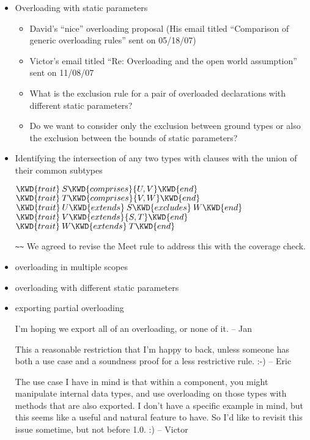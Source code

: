 \begin{itemize}
\item Overloading with static parameters
\begin{itemize}
\item David's ``nice'' overloading proposal (His email titled ``Comparison of generic overloading rules'' sent on 05/18/07)
\item Victor's email titled ``Re: Overloading and the open world assumption''
sent on 11/08/07
\item What is the exclusion rule for a pair of overloaded declarations with different static parameters?
\item Do we want to consider only the exclusion between ground types or also the exclusion between the bounds of static parameters?

\end{itemize}

\item Identifying the intersection of any two types with  clauses with the union of their common subtypes

\begin{Fortress}
\(\KWD{trait}\:S \KWD{comprises} \{U, V\} \KWD{end}\)\\
\(\KWD{trait}\:T \KWD{comprises} \{V, W\} \KWD{end}\)\\
\(\KWD{trait}\:U \KWD{extends}\:S \KWD{excludes}\:W \KWD{end}\)\\
\(\KWD{trait}\:V \KWD{extends} \{S, T\} \KWD{end}\)\\
\(\KWD{trait}\:W \KWD{extends}\:T \KWD{end}\)
\end{Fortress}

 \verb+~~+ 
We agreed to revise the Meet rule to address this with the coverage check.

  \item overloading in multiple scopes
  \item overloading with different static parameters
  \item exporting partial overloading

I'm hoping we export all of an overloading, or none of it. -- Jan

This a reasonable restriction that I'm happy to back, unless someone
has both a use case and a soundness proof for a less restrictive
rule. :-) -- Eric

The use case I have in mind is that within a component, you might
manipulate internal data types, and use overloading on those types
with methods that are also exported.  I don't have a specific example
in mind, but this seems like a useful and natural feature to have.  So
I'd like to revisit this issue sometime, but not before 1.0. :) -- Victor

\end{itemize}


